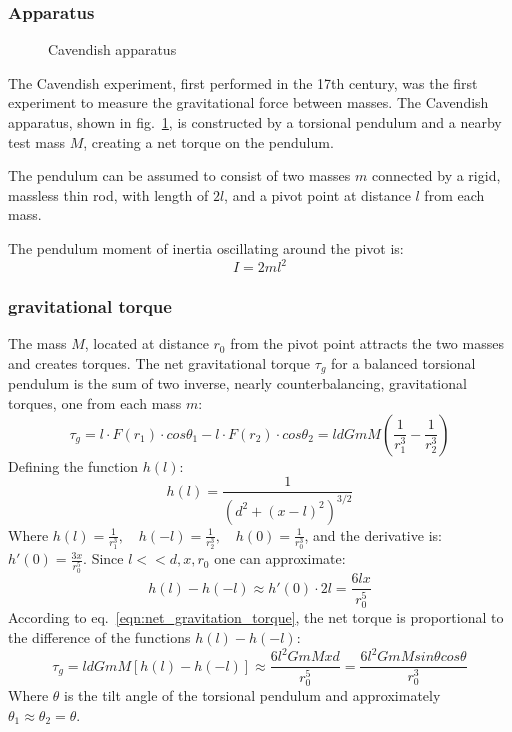 \documentclass[\main/master.tex]{subfiles}
\begin{document}
\subsubsection{Apparatus}
\begin{figure}[htbp]
	\centering
	\caption[Cavendish apparatus]{Cavendish apparatus \cite{howell2019}}
	\label{fig:Cavendish apparatus}
\end{figure}
\par\noindent
The Cavendish experiment, first performed in the 17th century, was the first experiment to measure the gravitational force between masses. The Cavendish apparatus, shown in fig.~\ref{fig:Cavendish apparatus}, is constructed by a torsional pendulum and a nearby test mass $M$, creating a net torque on the pendulum. 
\par\noindent
The pendulum can be assumed to consist of two masses $m$ connected by a rigid, massless thin rod, with length of $2l$, and a pivot point at distance $l$ from each mass.
\par\noindent
The pendulum moment of inertia oscillating around the pivot is:
\begin{equation}
I = 2ml^2     \label{eqn:moment_inertia}
\end{equation} 
\subsubsection{gravitational torque}
The mass $M$, located at distance $r_0$ from the pivot point attracts the two masses and creates torques. The net gravitational torque $\tau_g$ for a balanced torsional pendulum is the sum of two inverse, nearly counterbalancing, gravitational torques, one from each mass $m$:
\begin{equation}
\tau_g = l \cdot F(r_1) \cdot cos\theta_1 - l \cdot F(r_2) \cdot cos\theta_2 = l d GmM(\frac{1}{r_1^3} - \frac{1}{r_2^3})     \label{eqn:net_gravitation_torque}
\end{equation}
Defining the function $h(l)$:
\begin{equation}
h(l) = \frac{1}{(d^2 +(x-l)^2)^{3/2}} \label{eqn:gravitation torque func}
\end{equation}
Where $h(l) = \frac{1}{r_1^3},\quad	h(-l) = \frac{1}{r_2^3},\quad	h(0) = \frac{1}{r_0^3}$, and the derivative is: $h'(0) = \frac{3x}{r_0^5}$. Since $l<<d,x,r_0$ one can approximate:
\begin{equation}
h(l)-h(-l)\approx h'(0)\cdot 2l = \frac{6lx}{r_0^5}\label{eqn:approximation}
\end{equation}
According to eq.~\ref{eqn:net_gravitation_torque}, the net torque is proportional to the difference of the functions $h(l)-h(-l)$:
\begin{equation}
\tau_g = l d GmM[h(l)-h(-l)]\approx \frac{6l^2GmMxd} {r_0^5} = \frac{6l^2GmM sin\theta cos\theta}{r_0^3}      
\label{eqn:net_gravitation_torque_approx}
\end{equation}
Where $\theta$ is the tilt angle of the torsional pendulum and approximately $\theta_1 \approx \theta_2 = \theta$.
\end{document}
